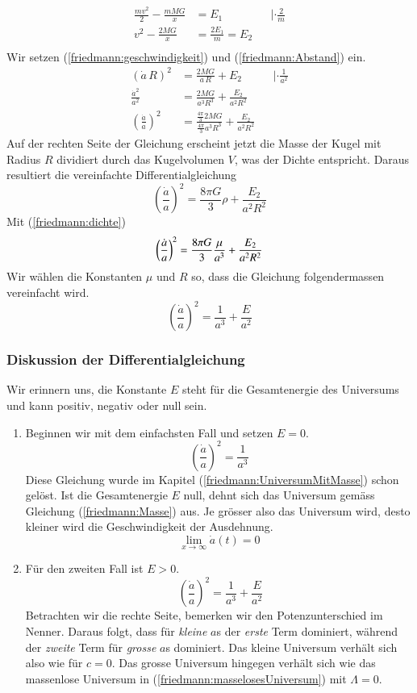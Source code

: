 \begin{refsection}
\begin{align*}
	\frac{m v^2}{2} - \frac{m M G}{x} &= E_1 &&| \cdot\frac{2}{m} \\ 
	v^2 - \frac{2 M G}{x} &= \frac{2E_1}{m} = E_2\\	
\end{align*}
Wir setzen (\ref{friedmann:geschwindigkeit}) und (\ref{friedmann:Abstand}) ein.
\begin{align*}
	\left( \dot{a} \, R\right)^2 &= \frac{2 M G}{a\,R} + E_2 &&| \cdot \frac{1}{a^2}\\
	\frac{\dot{a}^2}{a^2} &= \frac{2 M G}{a^3 R^3} + \frac{E_2}{a^2 R^2} \\
	\left(\frac{\dot{a}}{a} \right)^2 &= \frac{\frac{4 \pi}{3}2 M G}{\frac{4 \pi}{3} a^3 R^3} + \frac{E_2}{a^2 R^2}
\end{align*}
Auf der rechten Seite der Gleichung erscheint jetzt die Masse der Kugel mit Radius $R$ dividiert durch das Kugelvolumen $V$, was der Dichte entspricht. Daraus resultiert die vereinfachte Differentialgleichung 
\begin{equation}
\left(\frac{\dot{a}}{a} \right)^2 = \frac{8 \pi G}{3} \rho + \frac{E_2}{a^2 R^2}
\label{friedmann:EnergieerhaltungUniversum}
\end{equation}
Mit (\ref{friedmann:dichte})
\[\left(\frac{\dot{a}}{a} \right)^2 = \frac{8 \pi G}{3} \frac{\mu}{a^3} + \frac{E_2}{a^2 R^2} \\\]
Wir wählen die Konstanten $\mu$ und $R$ so, dass die Gleichung folgendermassen vereinfacht wird.
\begin{equation}
\left(\frac{\dot{a}}{a} \right)^2 = \frac{1}{a^3} + \frac{E}{a^2}
\end{equation}

\subsubsection{Diskussion der Differentialgleichung}
Wir erinnern uns, die Konstante $E$ steht für die Gesamtenergie des Universums und kann positiv, negativ oder null sein.
\begin{enumerate}
	\item Beginnen wir mit dem einfachsten Fall und setzen $E = 0$.
	\[\left(\frac{\dot{a}}{a} \right)^2 = \frac{1}{a^3}\]
	Diese Gleichung wurde im Kapitel (\ref{friedmann:UniversumMitMasse}) schon gelöst. Ist die Gesamtenergie $E$ null, dehnt sich das Universum gemäss Gleichung (\ref{friedmann:Masse}) aus. Je grösser also das Universum wird, desto kleiner wird die Geschwindigkeit der Ausdehnung.
	\[\lim_{x\to\infty} \dot{a}(t) = 0\]
	\item Für den zweiten Fall ist $E > 0$.
	\[\ \left(\frac{\dot{a}}{a} \right)^2 = \frac{1}{a^3} + \frac{E}{a^2}\]
	Betrachten wir die rechte Seite, bemerken wir den Potenzunterschied im Nenner. Daraus folgt, dass für {\em kleine} $a$s der {\em erste} Term dominiert, während der {\em zweite} Term für {\em grosse} $a$s dominiert. Das kleine Universum verhält sich also wie für $c = 0$. Das grosse Universum hingegen verhält sich wie das massenlose Universum in (\ref{friedmann:masselosesUniversum}) mit $\Lambda = 0$.  
	

\end{enumerate}
\end{refsection}
